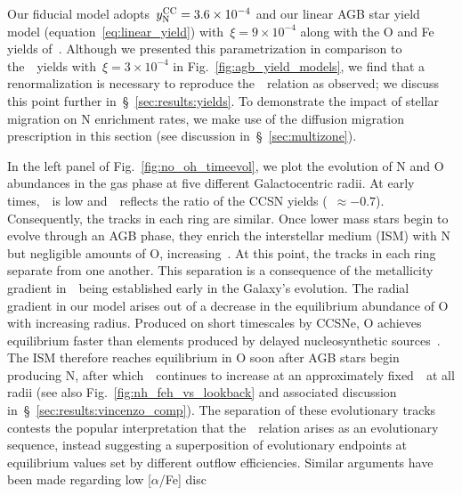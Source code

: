 \documentclass[ms.tex]{subfiles}
\begin{document}
Our fiducial model adopts~$y_\text{N}^\text{CC} = 3.6\times10^{-4}$ and our linear AGB star
yield model (equation~\ref{eq:linear_yield}) with~$\xi = 9\times10^{-4}$
along with the O and Fe yields of~\citet[][see discussion
in~\S~\ref{sec:yields}]{Johnson2021}.
Although we presented this parametrization in comparison to
the~\cristallo~yields with~$\xi = 3\times10^{-4}$ in
Fig.~\ref{fig:agb_yield_models}, we find that a renormalization is necessary to
reproduce the~\ohno~relation as observed; we discuss this point further
in~\S~\ref{sec:results:yields}.
To demonstrate the impact of stellar migration on N enrichment rates, we make
use of the diffusion migration prescription in this section (see discussion
in~\S~\ref{sec:multizone}).
\par
In the left panel of Fig.~\ref{fig:no_oh_timeevol}, we plot the evolution of N
and O abundances in the gas phase at five different Galactocentric radii.
At early times,~\oh~is low and~\no~reflects the ratio of the CCSN yields
(\no\subcc~$\approx -0.7$).
Consequently, the tracks in each ring are similar.
Once lower mass stars begin to evolve through an AGB phase, they enrich the
interstellar medium (ISM) with N but negligible amounts of O, increasing~\no.
At this point, the tracks in each ring separate from one another.
This separation is a consequence of the metallicity gradient in~\oh~being
established early in the Galaxy's evolution.
The radial gradient in our model arises out of a decrease in the equilibrium
abundance of O with increasing radius.
Produced on short timescales by CCSNe, O achieves equilibrium faster than
elements produced by delayed nucleosynthetic sources~\citep{Weinberg2017}.
The ISM therefore reaches equilibrium in O soon after AGB stars begin
producing N, after which~\no~continues to increase at an approximately
fixed~\oh~at all radii (see also Fig.~\ref{fig:nh_feh_vs_lookback} and
associated discussion in~\S~\ref{sec:results:vincenzo_comp}).
The separation of these evolutionary tracks contests the popular interpretation
that the~\ohno~relation arises as an evolutionary sequence, instead suggesting
a superposition of evolutionary endpoints at equilibrium values set by
different outflow efficiencies.
Similar arguments have been made regarding low [$\alpha$/Fe] disc
\end{document}
